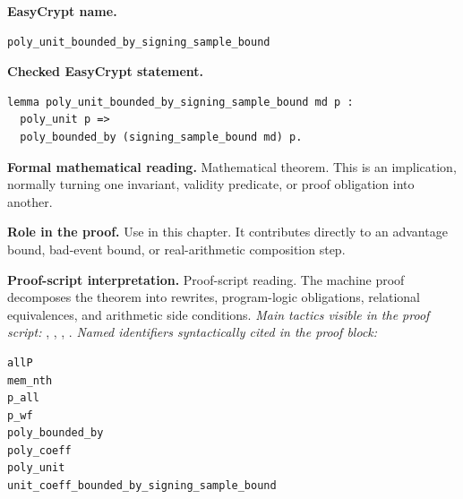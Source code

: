 \begin{formaltheorem}
\noindent\textbf{EasyCrypt name.}
\begin{lstlisting}[language=EasyCrypt,basicstyle=\ttfamily\scriptsize]
poly_unit_bounded_by_signing_sample_bound
\end{lstlisting}
\noindent\textbf{Checked EasyCrypt statement.}
\begin{lstlisting}[language=EasyCrypt,basicstyle=\ttfamily\scriptsize]
lemma poly_unit_bounded_by_signing_sample_bound md p :
  poly_unit p =>
  poly_bounded_by (signing_sample_bound md) p.
\end{lstlisting}
\noindent\textbf{Formal mathematical reading.}
Mathematical theorem. This is an implication, normally turning one invariant, validity predicate, or proof obligation into another.

\noindent\textbf{Role in the proof.}
Use in this chapter. It contributes directly to an advantage bound, bad-event bound, or real-arithmetic composition step.

\noindent\textbf{Proof-script interpretation.}
Proof-script reading. The machine proof decomposes the theorem into rewrites, program-logic obligations, relational equivalences, and arithmetic side conditions.
\emph{Main tactics visible in the proof script:} , , , .
\emph{Named identifiers syntactically cited in the proof block:}
\begin{lstlisting}[language=EasyCrypt,basicstyle=\ttfamily\scriptsize]
allP
mem_nth
p_all
p_wf
poly_bounded_by
poly_coeff
poly_unit
unit_coeff_bounded_by_signing_sample_bound
\end{lstlisting}

\end{formaltheorem}

